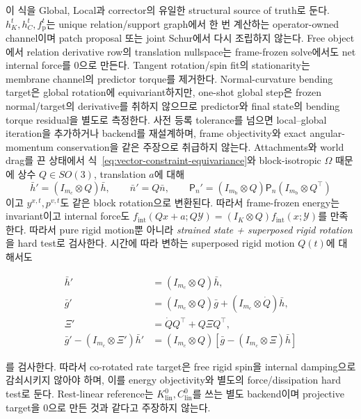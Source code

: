 \documentclass[11pt,a4paper]{article}
\begin{document}
이 식을 Global, Local과 corrector의 유일한 structural source of truth로 둔다.
\(h_K^t,h_C^t,f_{\mathrm p}^t\)는 unique relation/support graph에서 한 번 계산하는
operator-owned channel이며 patch proposal 또는 joint Schur에서 다시 조립하지 않는다.
Free object에서 relation derivative row의 translation nullspace는 frame-frozen solve에서도
net internal force를 0으로 만든다. Tangent rotation/spin fit의 stationarity는 membrane channel의
predictor torque를 제거한다. Normal-curvature bending target은 global rotation에 equivariant하지만,
one-shot global step은 frozen normal/target의 derivative를 취하지 않으므로 predictor와 final state의
bending torque residual을 별도로 측정한다. 사전 등록 tolerance를 넘으면 local--global iteration을
추가하거나 backend를 재설계하며, frame objectivity와 exact angular-momentum conservation을 같은
주장으로 취급하지 않는다.
Attachments와 world drag를 끈 상태에서 식~\eqref{eq:vector-constraint-equivariance}와
block-isotropic \(\Omega\) 때문에 상수 \(Q\in SO(3)\), translation \(a\)에 대해
\[
  \bar h'=(I_{m_c}\otimes Q)\bar h,
  \qquad
  \bar n'=Q\bar n,
  \qquad
  \mathsf P_n'=(I_{m_{\mathrm b}}\otimes Q)\mathsf P_n
  (I_{m_{\mathrm b}}\otimes Q^\top)
\]
이고 \(y^{x,t},p^{v,t}\)도 같은 block rotation으로 변환된다. 따라서 frame-frozen energy는
invariant이고 internal force도 \(f_{\mathrm{int}}(Qx+a;Q\mathcal Y)=
(I_K\otimes Q)f_{\mathrm{int}}(x;\mathcal Y)\)를 만족한다.
따라서 pure rigid motion뿐 아니라 \emph{strained state + superposed rigid rotation}을
hard test로 검사한다. 시간에 따라 변하는 superposed rigid motion \(Q(t)\)에 대해서도

\begin{equation}
\begin{aligned}
  \bar h'&=(I_{m_c}\otimes Q)\bar h,\\
  \bar g'&=(I_{m_c}\otimes Q)\bar g
    +(I_{m_c}\otimes\dot Q)\bar h,\\
  \Xi'&=\dot Q Q^\top+Q\Xi Q^\top,\\
  \bar g'-(I_{m_c}\otimes\Xi')\bar h'
  &=(I_{m_c}\otimes Q)
    [\bar g-(I_{m_c}\otimes\Xi)\bar h]
  \label{eq:relative-rate-objectivity}
\end{aligned}
\end{equation}

를 검사한다. 따라서 co-rotated rate target은 free rigid spin을 internal damping으로 감쇠시키지
않아야 하며, 이를 energy objectivity와 별도의 force/dissipation hard test로 둔다.
Rest-linear reference는 \(K_{\mathrm{lin}}^0,C_{\mathrm{lin}}^0\)를 쓰는 별도 backend이며
projective target을 0으로 만든 것과 같다고 주장하지 않는다.
\end{document}

